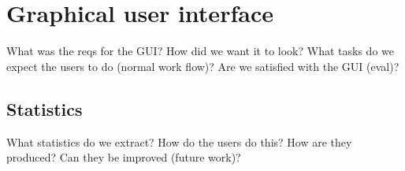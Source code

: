 
\section{Graphical user interface}

What was the reqs for the GUI?
How did we want it to look?
What tasks do we expect the users to do (normal work flow)?
Are we satisfied with the GUI (eval)?

\subsection{Statistics}
What statistics do we extract?
How do the users do this?
How are they produced?
Can they be improved (future work)?
